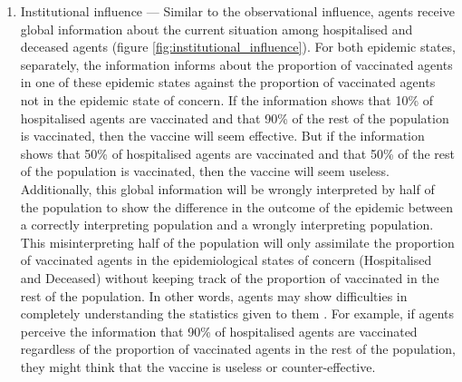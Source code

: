 \begin{enumerate}
    \item Institutional influence --- Similar to the observational influence, agents receive global information about the current situation among hospitalised and deceased agents (figure \ref{fig:institutional_influence}). For both epidemic states, separately, the information informs about the proportion of vaccinated agents in one of these epidemic states against the proportion of vaccinated agents not in the epidemic state of concern. If the information shows that 10\% of hospitalised agents are vaccinated and that 90\% of the rest of the population is vaccinated, then the vaccine will seem effective. But if the information shows that 50\% of hospitalised agents are vaccinated and that 50\% of the rest of the population is vaccinated, then the vaccine will seem useless. Additionally, this global information will be wrongly interpreted by half of the population to show the difference in the outcome of the epidemic between a correctly interpreting population and a wrongly interpreting population. This misinterpreting half of the population will only assimilate the proportion of vaccinated agents in the epidemiological states of concern (Hospitalised and Deceased) without keeping track of the proportion of vaccinated in the rest of the population. In other words, agents may show difficulties in completely understanding the statistics given to them \cite{francetvinfo_morts_vaccines_2021, lesoir_infographie_hospitalises_vaccines_2021}. For example, if agents perceive the information that 90\% of hospitalised agents are vaccinated regardless of the proportion of vaccinated agents in the rest of the population, they might think that the vaccine is useless or counter-effective.
\end{enumerate}

